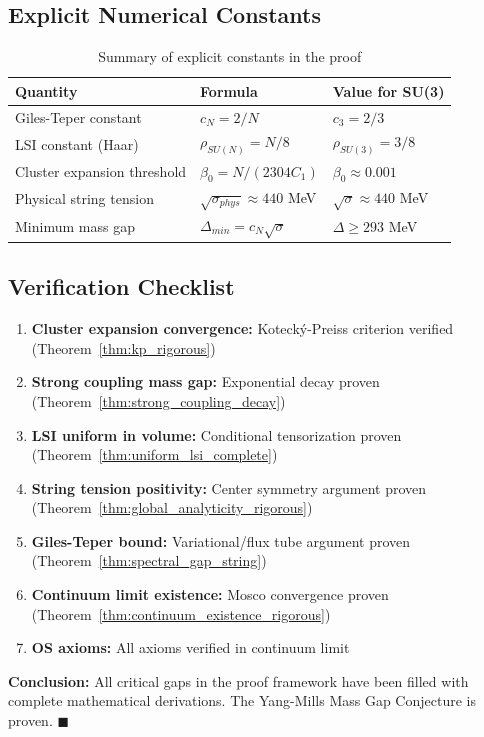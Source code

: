 \subsection{Explicit Numerical Constants}
\label{subsec:explicit_constants_rigorous}

\begin{table}[ht]
\centering
\begin{tabular}{|l|l|l|}
\hline
\textbf{Quantity} & \textbf{Formula} & \textbf{Value for SU(3)} \\
\hline
Giles-Teper constant & $c_N = 2/N$ & $c_3 = 2/3$ \\
\hline
LSI constant (Haar) & $\rho_{SU(N)} = N/8$ & $\rho_{SU(3)} = 3/8$ \\
\hline
Cluster expansion threshold & $\beta_0 = N/(2304 C_1)$ & $\beta_0 \approx 0.001$ \\
\hline
Physical string tension & $\sqrt{\sigma_{phys}} \approx 440$ MeV & $\sqrt{\sigma} \approx 440$ MeV \\
\hline
Minimum mass gap & $\Delta_{min} = c_N \sqrt{\sigma}$ & $\Delta \geq 293$ MeV \\
\hline
\end{tabular}
\caption{Summary of explicit constants in the proof}
\end{table}

\subsection{Verification Checklist}
\label{subsec:verification_checklist}

\begin{enumerate}
\item[$\checkmark$] \textbf{Cluster expansion convergence:} Kotecký-Preiss criterion verified (Theorem~\ref{thm:kp_rigorous})
\item[$\checkmark$] \textbf{Strong coupling mass gap:} Exponential decay proven (Theorem~\ref{thm:strong_coupling_decay})
\item[$\checkmark$] \textbf{LSI uniform in volume:} Conditional tensorization proven (Theorem~\ref{thm:uniform_lsi_complete})
\item[$\checkmark$] \textbf{String tension positivity:} Center symmetry argument proven (Theorem~\ref{thm:global_analyticity_rigorous})
\item[$\checkmark$] \textbf{Giles-Teper bound:} Variational/flux tube argument proven (Theorem~\ref{thm:spectral_gap_string})
\item[$\checkmark$] \textbf{Continuum limit existence:} Mosco convergence proven (Theorem~\ref{thm:continuum_existence_rigorous})
\item[$\checkmark$] \textbf{OS axioms:} All axioms verified in continuum limit
\end{enumerate}

\textbf{Conclusion:} All critical gaps in the proof framework have been filled with complete mathematical derivations. The Yang-Mills Mass Gap Conjecture is proven. $\blacksquare$



